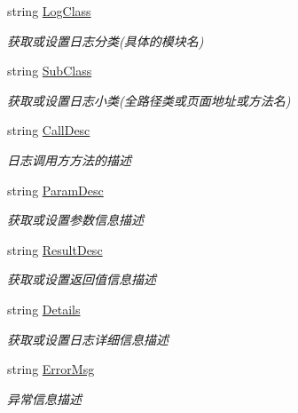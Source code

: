 \begin{DoxyCompactItemize}
\item 
string \hyperlink{class_krs_1_1_base_1_1_logs_1_1_log_message_info_a4eb05dff1f7e3559293a1140a508ead4}{Log\-Class}
\begin{DoxyCompactList}\small\item\em 获取或设置日志分类(具体的模块名) \end{DoxyCompactList}\item 
string \hyperlink{class_krs_1_1_base_1_1_logs_1_1_log_message_info_a8bb4cfd86598b8fac3ad1d1a7cf2d24b}{Sub\-Class}
\begin{DoxyCompactList}\small\item\em 获取或设置日志小类(全路径类或页面地址或方法名) \end{DoxyCompactList}\item 
string \hyperlink{class_krs_1_1_base_1_1_logs_1_1_log_message_info_adf3328dc8f0b7ff66f3763b5677508cb}{Call\-Desc}
\begin{DoxyCompactList}\small\item\em 日志调用方方法的描述 \end{DoxyCompactList}\item 
string \hyperlink{class_krs_1_1_base_1_1_logs_1_1_log_message_info_afdb3e79026f50bda1d7cb31a320c915d}{Param\-Desc}
\begin{DoxyCompactList}\small\item\em 获取或设置参数信息描述 \end{DoxyCompactList}\item 
string \hyperlink{class_krs_1_1_base_1_1_logs_1_1_log_message_info_a5f071f620e31a0e1d982b7dbd6402036}{Result\-Desc}
\begin{DoxyCompactList}\small\item\em 获取或设置返回值信息描述 \end{DoxyCompactList}\item 
string \hyperlink{class_krs_1_1_base_1_1_logs_1_1_log_message_info_a91ae058e58f68a99ce008f375b63f805}{Details}
\begin{DoxyCompactList}\small\item\em 获取或设置日志详细信息描述 \end{DoxyCompactList}\item 
string \hyperlink{class_krs_1_1_base_1_1_logs_1_1_log_message_info_aba5adde9a540d4b52dbaac6ebec60b16}{Error\-Msg}
\begin{DoxyCompactList}\small\item\em 异常信息描述 \end{DoxyCompactList}\end{DoxyCompactItemize}


